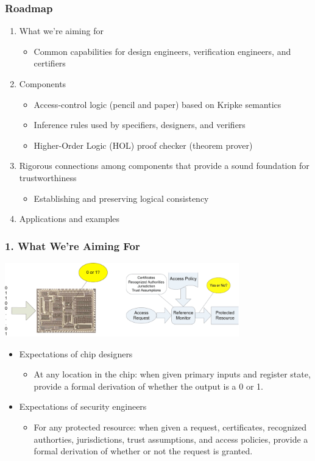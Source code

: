 \documentclass[blue]{beamer}
\begin{document}
\begin{frame}
  \frametitle{Roadmap}
  \begin{enumerate}
  \item<2-> What we're aiming for
    \begin{itemize}
    \item<3-> Common capabilities for design engineers, verification
      engineers, and certifiers
    \end{itemize}

  \item<4-> Components
    \begin{itemize}
    \item<5-> Access-control logic (pencil and paper) based on Kripke semantics
    \item<5-> Inference rules used by specifiers, designers, and verifiers
    \item<5-> Higher-Order Logic (HOL) proof checker (theorem prover)
    \end{itemize}
  \item<6-> Rigorous connections among components that provide a sound
    foundation for trustworthiness
    \begin{itemize}
    \item<7-> Establishing and preserving logical consistency
    \end{itemize}
  \item<8-> Applications and examples

  \end{enumerate}
\end{frame}
\begin{frame}
  \frametitle{1. What We're Aiming For}
  \includegraphics[width=4in]{Figures/Expectations}
  \begin{itemize}
  \item<2-> Expectations of chip designers
    \begin{itemize}
    \item<3-> At any location in the chip: when given primary inputs
      and register state, provide a formal derivation of whether the
      output is a 0 or 1.
    \end{itemize}
  \item<4-> Expectations of security engineers
    \begin{itemize}
    \item<5-> For any protected resource: when given a request,
      certificates, recognized authorties, jurisdictions, trust
      assumptions, and access policies, provide a formal derivation of
      whether or not the request is granted.
    \end{itemize}
  \end{itemize}
\end{frame}
\end{document}

